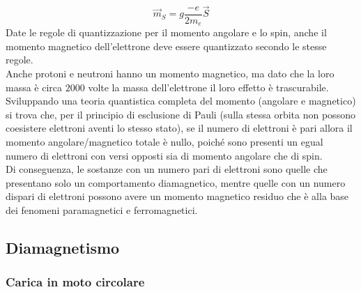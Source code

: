 \begin{equation}
	\vec{m}_S = g \frac{-e}{2m_e}\vec{S}
	\label{eq:2}
\end{equation}
Date le regole di quantizzazione per il momento angolare e lo spin, anche il momento magnetico dell'elettrone deve essere quantizzato secondo le stesse regole. \\ 
%
Anche protoni e neutroni hanno un momento magnetico, ma dato che la loro massa è circa $ 2000 $ volte la massa dell'elettrone il loro effetto è trascurabile. \\ 
%
Sviluppando una teoria quantistica completa del momento (angolare e magnetico) si trova che, per il principio di esclusione di Pauli (sulla stessa orbita non possono coesistere elettroni aventi lo stesso stato), se il numero di elettroni è pari allora il momento angolare/magnetico totale è nullo, poiché sono presenti un egual numero di elettroni con versi opposti sia di momento angolare che di spin. \\ 
Di conseguenza, le sostanze con un numero pari di elettroni sono quelle che presentano solo un comportamento diamagnetico, mentre quelle con un numero dispari di elettroni possono avere un momento magnetico residuo che è alla base dei fenomeni paramagnetici e ferromagnetici.

\subsection{Diamagnetismo}

\subsubsection{Carica in moto circolare}

